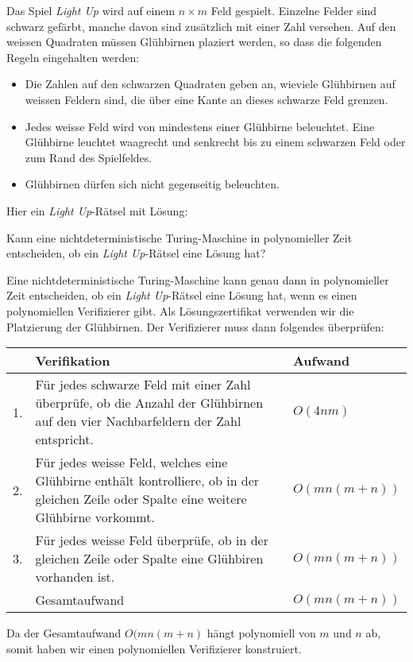 Das Spiel {\em Light Up} wird auf einem $n\times m$ Feld gespielt.
Einzelne Felder sind schwarz gefärbt, manche davon sind zusätzlich
mit einer Zahl versehen.
Auf den weissen Quadraten müssen Glühbirnen plaziert werden,
so dass die folgenden Regeln eingehalten werden: 
\begin{itemize}
\item
Die Zahlen auf den schwarzen Quadraten geben an, wieviele Glühbirnen
auf weissen Feldern sind, die über eine Kante an dieses schwarze Feld grenzen. 
\item
Jedes weisse Feld wird von mindestens einer Glühbirne beleuchtet.
Eine Glühbirne leuchtet waagrecht und senkrecht bis zu einem schwarzen Feld
oder zum Rand des Spielfeldes. 
\item
Glühbirnen dürfen sich nicht gegenseitig beleuchten. 
\end{itemize}
Hier ein {\em Light Up}-Rätsel mit Lösung:
\begin{center}
\qquad
{}
\end{center}

Kann eine nichtdeterministische Turing-Maschine in polynomieller Zeit
entscheiden, ob ein {\em Light Up}-Rätsel eine Lösung hat?


\begin{loesung}
Eine nichtdeterministische Turing-Maschine kann genau dann in polynomieller
Zeit entscheiden, ob ein {\em Light Up}-Rätsel eine Lösung hat,
wenn es einen polynomiellen Verifizierer gibt.
Als Lösungszertifikat verwenden wir die Platzierung der Glühbirnen.
Der Verifizierer muss dann folgendes überprüfen:
\begin{center}
\begin{tabular}{rll}
  &Verifikation&Aufwand\\
\hline
1.&\begin{minipage}[t]{12cm}\strut
Für jedes schwarze Feld mit einer Zahl überprüfe, ob die Anzahl
der Glühbirnen auf den vier Nachbarfeldern der Zahl entspricht.
\strut\end{minipage}&$O(4nm)$\\
2.&\begin{minipage}[t]{12cm}\strut
Für jedes weisse Feld, welches eine Glühbirne enthält kontrolliere,
ob in der gleichen Zeile oder Spalte eine weitere Glühbirne vorkommt.
\strut\end{minipage}&$O(mn(m+n))$\\
3.&\begin{minipage}[t]{12cm}\strut
Für jedes weisse Feld überprüfe, ob in der gleichen Zeile oder
Spalte eine Glühbiren vorhanden ist.
\strut\end{minipage}&$O(mn(m+n))$\\
\hline
&Gesamtaufwand&$O(mn(m+n))$
\end{tabular}
\end{center}
Da der Gesamtaufwand $O(mn(m+n)$ hängt polynomiell von $m$ und $n$
ab, somit haben wir einen polynomiellen Verifizierer konstruiert.
\end{loesung}

